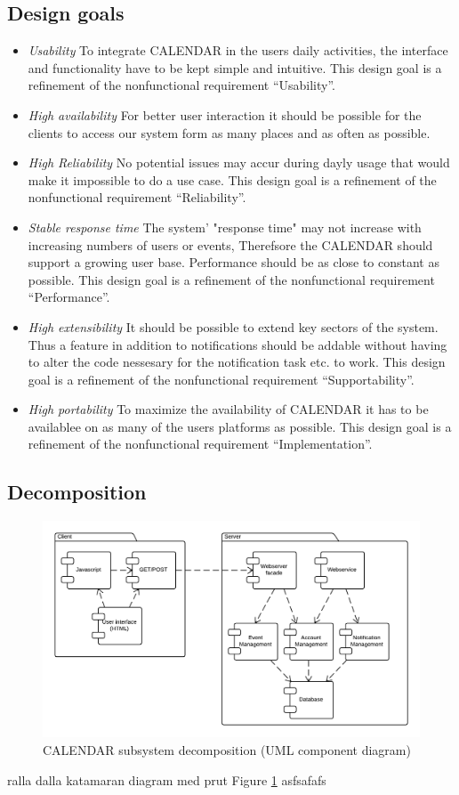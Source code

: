 \documentclass[a4paper]{article}
\begin{document}
\subsection{Design goals}

\begin{itemize}
\item \textit{Usability}
To integrate CALENDAR in the users daily activities, the interface and functionality have to be kept simple and intuitive. This design goal is a refinement of the nonfunctional requirement “Usability”.
\item \textit{High availability}
For better user interaction it should be possible for the clients to access our system form as many places and as often as possible.
\item \textit{High Reliability}
No potential issues may accur during dayly usage that would make it impossible to do a use case. This design goal is a refinement of the nonfunctional requirement “Reliability”.
\item \textit{Stable response time}
The system' "response time" may not increase with increasing numbers of users or events, Therefsore the CALENDAR should support a growing user base. Performance should be as close to constant  as possible. This design goal is a refinement of the nonfunctional requirement “Performance”.
\item \textit{High extensibility}
It should be possible to extend key sectors of the system. Thus a feature in addition to notifications should be addable without having
to alter the code nessesary for the notification task etc. to work. This design goal is a refinement of the nonfunctional requirement “Supportability”.
\item \textit{High portability}
To maximize the availability of CALENDAR it has to be availablee on as many of the users platforms as possible. This design goal is a refinement of the nonfunctional requirement “Implementation”.
\end{itemize}

\subsection{Decomposition}

\begin{figure}
\includegraphics[scale = 0.3]{Subsystems.png}
\caption{CALENDAR subsystem decomposition (UML component diagram)}
\label{fig:decomposition}  %
\end{figure}

ralla dalla katamaran diagram med prut Figure \ref{fig:decomposition} asfsafafs
\end{document}
